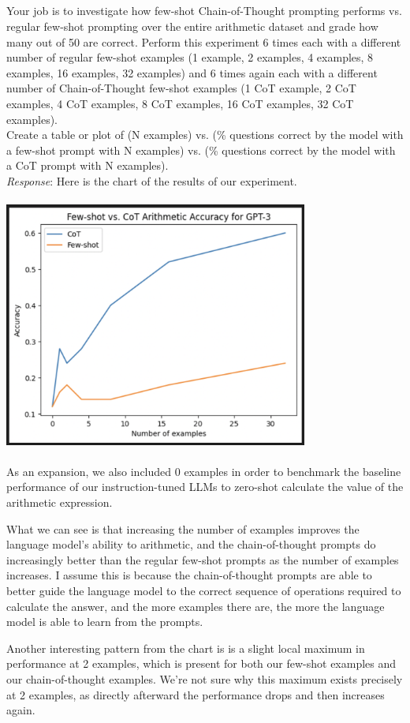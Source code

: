 \documentclass{article}
\begin{document}
\subsection{}
Your job is to investigate how few-shot Chain-of-Thought prompting performs vs. regular few-shot prompting over the entire arithmetic dataset and grade how many out of 50 are correct. Perform this experiment 6 times each with a different number of regular few-shot examples (1 example, 2 examples, 4 examples, 8 examples, 16 examples, 32 examples) and 6 times again each with a different number of Chain-of-Thought few-shot examples (1 CoT example, 2 CoT examples, 4 CoT examples, 8 CoT examples, 16 CoT examples, 32 CoT examples).
\\Create a table or plot of (N examples) vs. (\% questions correct by the model with a few-shot prompt with N examples) vs. (\% questions correct by the model with a CoT prompt with N examples).
\\ \emph{Response}: Here is the chart of the results of our experiment.\\\\
\includegraphics[width=0.75\textwidth]{chart}\\\\
As an expansion, we also included 0 examples in order to benchmark the baseline performance of our instruction-tuned LLMs to zero-shot calculate the value of the arithmetic expression.

What we can see is that increasing the number of examples improves the language model's ability to arithmetic, and the chain-of-thought prompts do increasingly better than the regular few-shot prompts as the number of examples increases. I assume this is because the chain-of-thought prompts are able to better guide the language model to the correct sequence of operations required to calculate the answer, and the more examples there are, the more the language model is able to learn from the prompts.

Another interesting pattern from the chart is is a slight local maximum in performance at 2 examples, which is present for both our few-shot examples and our chain-of-thought examples. We're not sure why this maximum exists precisely at 2 examples, as directly afterward the performance drops and then increases again.
\end{document}
